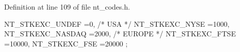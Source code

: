 Definition at line 109 of file nt\_\-codes.h.




\begin{DoxyCode}
                      {  NT_STKEXC_UNDEF        =0,
                /* USA */
                NT_STKEXC_NYSE      =1000,
                NT_STKEXC_NASDAQ    =2000,
                /* EUROPE */
                NT_STKEXC_FTSE      =10000,
                NT_STKEXC_FSE       =20000
            } ;
\end{DoxyCode}



